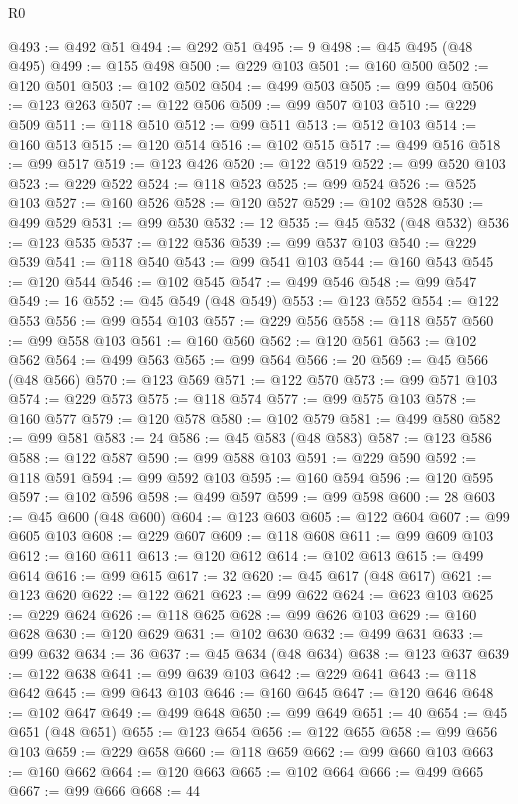 \begin{lexlean}{R0}
\begin{coremodule}
@493 := @492 @51
@494 := @292 @51
@495 := 9
@498 := @45 @495 (@48 @495)
@499 := @155 @498
@500 := @229 @103
@501 := @160 @500
@502 := @120 @501
@503 := @102 @502
@504 := @499 @503
@505 := @99 @504
@506 := @123 @263
@507 := @122 @506
@509 := @99 @507 @103
@510 := @229 @509
@511 := @118 @510
@512 := @99 @511
@513 := @512 @103
@514 := @160 @513
@515 := @120 @514
@516 := @102 @515
@517 := @499 @516
@518 := @99 @517
@519 := @123 @426
@520 := @122 @519
@522 := @99 @520 @103
@523 := @229 @522
@524 := @118 @523
@525 := @99 @524
@526 := @525 @103
@527 := @160 @526
@528 := @120 @527
@529 := @102 @528
@530 := @499 @529
@531 := @99 @530
@532 := 12
@535 := @45 @532 (@48 @532)
@536 := @123 @535
@537 := @122 @536
@539 := @99 @537 @103
@540 := @229 @539
@541 := @118 @540
@543 := @99 @541 @103
@544 := @160 @543
@545 := @120 @544
@546 := @102 @545
@547 := @499 @546
@548 := @99 @547
@549 := 16
@552 := @45 @549 (@48 @549)
@553 := @123 @552
@554 := @122 @553
@556 := @99 @554 @103
@557 := @229 @556
@558 := @118 @557
@560 := @99 @558 @103
@561 := @160 @560
@562 := @120 @561
@563 := @102 @562
@564 := @499 @563
@565 := @99 @564
@566 := 20
@569 := @45 @566 (@48 @566)
@570 := @123 @569
@571 := @122 @570
@573 := @99 @571 @103
@574 := @229 @573
@575 := @118 @574
@577 := @99 @575 @103
@578 := @160 @577
@579 := @120 @578
@580 := @102 @579
@581 := @499 @580
@582 := @99 @581
@583 := 24
@586 := @45 @583 (@48 @583)
@587 := @123 @586
@588 := @122 @587
@590 := @99 @588 @103
@591 := @229 @590
@592 := @118 @591
@594 := @99 @592 @103
@595 := @160 @594
@596 := @120 @595
@597 := @102 @596
@598 := @499 @597
@599 := @99 @598
@600 := 28
@603 := @45 @600 (@48 @600)
@604 := @123 @603
@605 := @122 @604
@607 := @99 @605 @103
@608 := @229 @607
@609 := @118 @608
@611 := @99 @609 @103
@612 := @160 @611
@613 := @120 @612
@614 := @102 @613
@615 := @499 @614
@616 := @99 @615
@617 := 32
@620 := @45 @617 (@48 @617)
@621 := @123 @620
@622 := @122 @621
@623 := @99 @622
@624 := @623 @103
@625 := @229 @624
@626 := @118 @625
@628 := @99 @626 @103
@629 := @160 @628
@630 := @120 @629
@631 := @102 @630
@632 := @499 @631
@633 := @99 @632
@634 := 36
@637 := @45 @634 (@48 @634)
@638 := @123 @637
@639 := @122 @638
@641 := @99 @639 @103
@642 := @229 @641
@643 := @118 @642
@645 := @99 @643 @103
@646 := @160 @645
@647 := @120 @646
@648 := @102 @647
@649 := @499 @648
@650 := @99 @649
@651 := 40
@654 := @45 @651 (@48 @651)
@655 := @123 @654
@656 := @122 @655
@658 := @99 @656 @103
@659 := @229 @658
@660 := @118 @659
@662 := @99 @660 @103
@663 := @160 @662
@664 := @120 @663
@665 := @102 @664
@666 := @499 @665
@667 := @99 @666
@668 := 44

\end{coremodule}
\end{lexlean}
